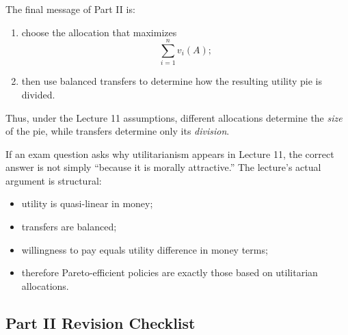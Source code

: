 \begin{policynote}[title={Efficiency then distribution}]
The final message of Part II is:
\begin{enumerate}
    \item choose the allocation that maximizes
    \[
    \sum_{i=1}^n v_i(A);
    \]
    \item then use balanced transfers to determine how the resulting utility pie is divided.
\end{enumerate}
Thus, under the Lecture 11 assumptions, different allocations determine the \emph{size} of the pie, while transfers determine only its \emph{division}.
\end{policynote}

\begin{examtip}
If an exam question asks why utilitarianism appears in Lecture 11, the correct answer is not simply ``because it is morally attractive.'' The lecture's actual argument is structural:
\begin{itemize}
    \item utility is quasi-linear in money;
    \item transfers are balanced;
    \item willingness to pay equals utility difference in money terms;
    \item therefore Pareto-efficient policies are exactly those based on utilitarian allocations.
\end{itemize}
\end{examtip}

\subsection{Part II Revision Checklist}

